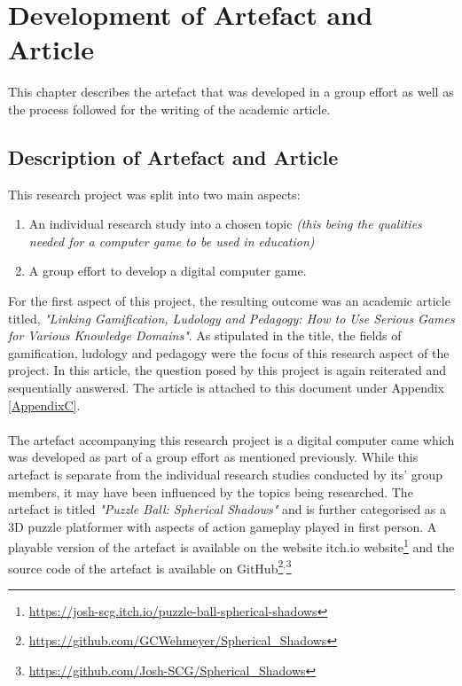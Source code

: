 
\chapter{Development of Artefact and Article} %

\label{Chapter3} %

This chapter describes the artefact that was developed in a group effort as well as the process followed for the writing of the academic article.

\section{Description of Artefact and Article}
This research project was split into two main aspects: 
\begin{enumerate}
\item An individual research study into a chosen topic \textit{(this being the qualities needed for a computer game to be used in education)}
\item A group effort to develop a digital computer game.
\end{enumerate}

\noindent For the first aspect of this project, the resulting outcome was an academic article titled, \textit{"Linking Gamification, Ludology and Pedagogy: How to Use Serious Games for Various Knowledge Domains"}. As stipulated in the title, the fields of gamification, ludology and pedagogy were the focus of this research aspect of the project. In this article, the question posed by this project is again reiterated and sequentially answered. The article is attached to this document under Appendix  \ref{AppendixC}. 
\\\\
The artefact accompanying this research project is a digital computer came which was developed as part of a group effort as mentioned previously. While this artefact is separate from the individual research studies conducted by its' group members, it may have been influenced by the topics being researched. The artefact is titled \textit{"Puzzle Ball: Spherical Shadows"} and is further categorised as a 3D puzzle platformer with aspects of action gameplay played in first person. A playable version of the artefact is available on the website itch.io website\footnote{\url{https://josh-scg.itch.io/puzzle-ball-spherical-shadows}} and the source code of the artefact is available on GitHub\footnote{\url{https://github.com/GCWehmeyer/Spherical_Shadows}}$^{,}$\footnote{\url{https://github.com/Josh-SCG/Spherical_Shadows}}

